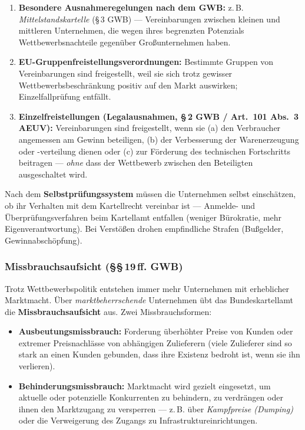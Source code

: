 \documentclass[11pt, a4paper]{article}
\begin{document}
\begin{enumerate}
  \item \textbf{Besondere Ausnahmeregelungen nach dem GWB:} z.\,B.
    \emph{Mittelstandskartelle} (\S\,3 GWB) --- Vereinbarungen zwischen kleinen und
    mittleren Unternehmen, die wegen ihres begrenzten Potenzials Wettbewerbsnachteile
    gegenüber Großunternehmen haben.
  \item \textbf{EU-Gruppenfreistellungsverordnungen:} Bestimmte Gruppen von Vereinbarungen
    sind freigestellt, weil sie sich trotz gewisser Wettbewerbsbeschränkung positiv auf
    den Markt auswirken; Einzelfallprüfung entfällt.
  \item \textbf{Einzelfreistellungen (Legalausnahmen, \S\,2 GWB / Art.~101 Abs.~3 AEUV):}
    Vereinbarungen sind freigestellt, wenn sie (a) den Verbraucher angemessen am Gewinn
    beteiligen, (b) der Verbesserung der Warenerzeugung oder -verteilung dienen oder
    (c) zur Förderung des technischen Fortschritts beitragen --- \emph{ohne} dass der
    Wettbewerb zwischen den Beteiligten ausgeschaltet wird.
\end{enumerate}

Nach dem \textbf{Selbstprüfungssystem} müssen die Unternehmen selbst einschätzen, ob ihr
Verhalten mit dem Kartellrecht vereinbar ist --- Anmelde- und Überprüfungsverfahren beim
Kartellamt entfallen (weniger Bürokratie, mehr Eigenverantwortung). Bei Verstößen drohen
empfindliche Strafen (Bußgelder, Gewinnabschöpfung).

\subsubsection{Missbrauchsaufsicht (\S\S\,19\,ff. GWB)}

Trotz Wettbewerbspolitik entstehen immer mehr Unternehmen mit erheblicher Marktmacht.
Über \emph{marktbeherrschende} Unternehmen übt das Bundeskartellamt die
\textbf{Missbrauchsaufsicht} aus. Zwei Missbrauchsformen:

\begin{itemize}
  \item \textbf{Ausbeutungsmissbrauch:} Forderung überhöhter Preise von Kunden oder
    extremer Preisnachlässe von abhängigen Zulieferern (viele Zulieferer sind so stark an
    einen Kunden gebunden, dass ihre Existenz bedroht ist, wenn sie ihn verlieren).
  \item \textbf{Behinderungsmissbrauch:} Marktmacht wird gezielt eingesetzt, um aktuelle
    oder potenzielle Konkurrenten zu behindern, zu verdrängen oder ihnen den Marktzugang
    zu versperren --- z.\,B. über \emph{Kampfpreise (Dumping)} oder die Verweigerung des
    Zugangs zu Infrastruktureinrichtungen.
\end{itemize}
\end{document}
